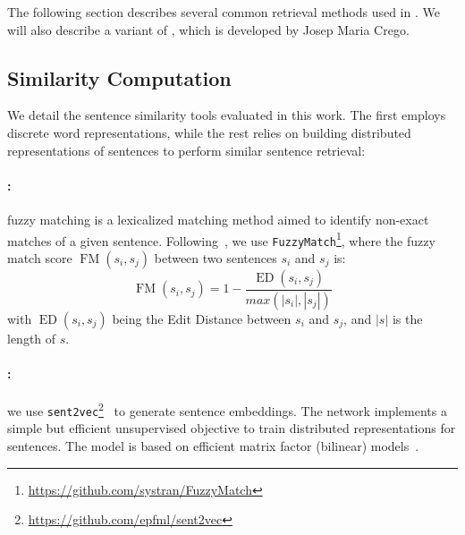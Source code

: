 The following section describes several common retrieval methods used in \citet{Farajian17multidomain,bapna19non,bulte19neural,xu20boosting}. We will also describe a variant of \citet{pagliardini18unsupervised}, which is developed by Josep Maria Crego.
\subsection{Similarity Computation}
\label{ssec:sim-chap8}
We detail the sentence similarity tools evaluated in this work. The first employs discrete word representations, while the rest relies on building distributed representations of sentences to perform similar sentence retrieval:
\paragraph{:} fuzzy matching is a lexicalized matching method aimed to identify non-exact matches of a given sentence. Following~\citet{xu20boosting}, we use \texttt{FuzzyMatch}\footnote{\url{https://github.com/systran/FuzzyMatch}}, where the fuzzy match score $\operatorname{FM} (s_i,s_j)$ between two sentences $s_i$ and $s_j$ is:
    \begin{equation*}
    \operatorname{FM} (s_i,s_j) = 1 - \frac{\operatorname{ED} (s_i,s_j)}{max(|s_i|,|s_j|)}
    \label{eq:FM-chap8}
    \end{equation*}
    \noindent with $\operatorname{ED}(s_i,s_j)$ being the Edit Distance between $s_i$ and $s_j$, and $|s|$ is the length of $s$. 
\paragraph{:} we use \texttt{sent2vec}\footnote{\url{https://github.com/epfml/sent2vec}}~\citep{pagliardini18unsupervised} to generate sentence embeddings. The network implements a simple but efficient unsupervised objective to train distributed representations for sentences. The model is based on efficient matrix factor (bilinear) models~\citep{Mikolov13efficient,Mikolov13distributed,Pennington14glove}.
%
